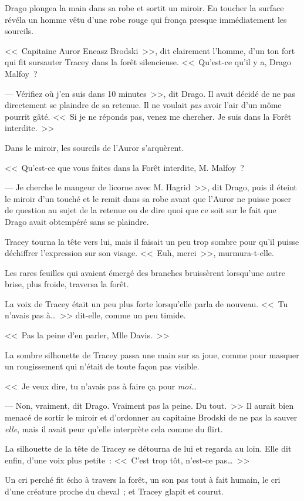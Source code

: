 Drago plongea la main dans sa robe et sortit un miroir. En toucher la surface révéla un homme vêtu d'une robe rouge qui fronça presque immédiatement les sourcils.

<<~Capitaine Auror Eneasz Brodski~>>, dit clairement l'homme, d'un ton fort qui fit sursauter Tracey dans la forêt silencieuse. <<~Qu'est-ce qu'il y a, Drago Malfoy~?

--- Vérifiez où j'en suis dans 10 minutes~>>, dit Drago. Il avait décidé de ne pas directement se plaindre de sa retenue. Il ne voulait \emph{pas} avoir l'air d'un môme pourrit gâté. <<~Si je ne réponds pas, venez me chercher. Je suis dans la Forêt interdite.~>>

Dans le miroir, les sourcils de l'Auror s'arquèrent.

<<~Qu'est-ce que vous faites dans la Forêt interdite, M. Malfoy~?

--- Je cherche le mangeur de licorne avec M. Hagrid~>>, dit Drago, puis il éteint le miroir d'un touché et le remit dans sa robe avant que l'Auror ne puisse poser de question au sujet de la retenue ou de dire quoi que ce soit sur le fait que Drago avait obtempéré sans se plaindre.

Tracey tourna la tête vers lui, mais il faisait un peu trop sombre pour qu'il puisse déchiffrer l'expression sur son visage. <<~Euh, merci~>>, murmura-t-elle.

Les rares feuilles qui avaient émergé des branches bruissèrent lorsqu'une autre brise, plus froide, traversa la forêt.

La voix de Tracey était un peu plus forte lorsqu'elle parla de nouveau. <<~Tu n'avais pas à…~>> dit-elle, comme un peu timide.

<<~Pas la peine d'en parler, Mlle Davis.~>>

La sombre silhouette de Tracey passa une main sur sa joue, comme pour masquer un rougissement qui n'était de toute façon pas visible.

<<~Je veux dire, tu n'avais pas à faire ça pour \emph{moi}…

--- Non, vraiment, dit Drago. Vraiment pas la peine. Du tout.~>> Il aurait bien menacé de sortir le miroir et d'ordonner au capitaine Brodski de ne pas la sauver \emph{elle}, mais il avait peur qu'elle interprète cela comme du flirt.

La silhouette de la tête de Tracey se détourna de lui et regarda au loin. Elle dit enfin, d'une voix plus petite~: <<~C'est trop tôt, n'est-ce pas…~>>

Un cri perché fit écho à travers la forêt, un son pas tout à fait humain, le cri d'une créature proche du cheval~; et Tracey glapit et courut.


